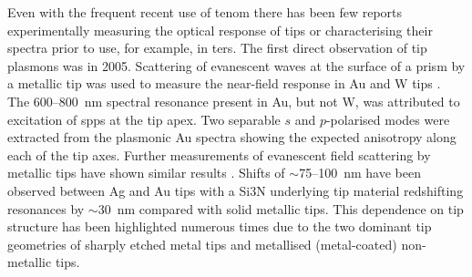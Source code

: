 \documentclass{article}
\begin{document}


Even with the frequent recent use of \gls{tenom} there has been few reports experimentally measuring the optical response of tips or characterising their spectra prior to use, for example, in \gls{ters}. The first direct observation of tip plasmons was in 2005. Scattering of evanescent waves at the surface of a prism by a metallic tip was used to measure the near-field response in Au and W tips \cite{neacsu2005}. The 600--\SI{800}{nm} spectral resonance present in Au, but not W, was attributed to excitation of \glspl{spp} at the tip apex. Two separable $s$ and $p$-polarised modes were extracted from the plasmonic Au spectra showing the expected anisotropy along each of the tip axes.
Further measurements of evanescent field scattering by metallic tips have shown similar results \cite{mehtani2006, barrios2009}. Shifts of $\sim$75--\SI{100}{nm} have been observed between Ag and Au tips with a Si\subs3N underlying tip material redshifting resonances by $\sim$\SI{30}{nm} compared with solid metallic tips. This dependence on tip structure has been highlighted numerous times due to the two dominant tip geometries of sharply etched metal tips and metallised (metal-coated) non-metallic tips.
\end{document}
